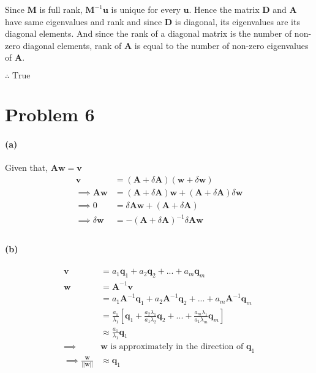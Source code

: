 \documentclass[12pt, letterpaper]{article}
\begin{document}
Since $\mathbf{M}$ is full rank, $\mathbf{M}^{-1}\mathbf{u}$ is unique for every $\mathbf{u}$. Hence the matrix $\mathbf{D}$ and $\mathbf{A}$ have same eigenvalues and rank and since $\mathbf{D}$ is diagonal, its eigenvalues are its diagonal elements. And since the rank of a diagonal matrix is the number of non-zero diagonal elements, rank of $\mathbf{A}$ is equal to the number of non-zero eigenvalues of $\mathbf{A}$.

\vspace{1cm}
$\boxed{\therefore \text{ True }}$

\pagebreak
\section*{Problem 6}

\paragraph{(a)} Given that, $\mathbf{A}\mathbf{w} = \mathbf{v}$
\begin{align*}
   \mathbf{v} &= (\mathbf{A} + \delta \mathbf{A})(\mathbf{w} + \delta \mathbf{w}) \\
  \implies \mathbf{A}\mathbf{w} &= (\mathbf{A} + \delta \mathbf{A})\mathbf{w}
  + (\mathbf{A} + \delta \mathbf{A})\delta \mathbf{w} \\
  \implies 0 &= \delta \mathbf{A}\mathbf{w} + (\mathbf{A} + \delta \mathbf{A}) \\
  \implies \delta \mathbf{w} &= -(\mathbf{A} + \delta \mathbf{A})^{-1}\delta \mathbf{A}\mathbf{w} \\
\end{align*}

\paragraph{(b)}
\begin{align*}
  \mathbf{v} &= a_1\mathbf{q}_1 + a_2\mathbf{q}_2 + ... + a_m\mathbf{q}_m\\
  \mathbf{w} &= \mathbf{A}^{-1}\mathbf{v} \\
  &= a_1\mathbf{A}^{-1}\mathbf{q}_1 + a_2\mathbf{A}^{-1}\mathbf{q}_2 + ... + a_m\mathbf{A}^{-1}\mathbf{q}_m\\
             &= \frac{a_1}{\lambda_1}\left[ \mathbf{q}_1 + \frac{a_2\lambda_1}{a_1\lambda_2}\mathbf{q}_{2} + ... + \frac{a_m\lambda_1}{a_1\lambda_m}\mathbf{q}_{m}\right] \\
  &\approx \frac{a_1}{\lambda_1}\mathbf{q}_1 \\
  \implies &\text{$\mathbf{w}$ is approximately in the direction of $\mathbf{q}_1$}\\
  \implies \frac{\mathbf{w}}{||\mathbf{w}||} &\approx \mathbf{q}_1\\
\end{align*}
\end{document}
